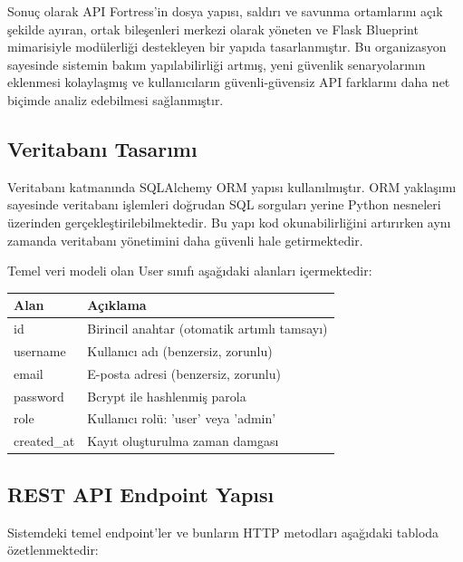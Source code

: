 Sonuç olarak API Fortress’in dosya yapısı, saldırı ve savunma ortamlarını açık şekilde ayıran, ortak bileşenleri merkezi olarak yöneten ve Flask Blueprint mimarisiyle modülerliği destekleyen bir yapıda tasarlanmıştır. Bu organizasyon sayesinde sistemin bakım yapılabilirliği artmış, yeni güvenlik senaryolarının eklenmesi kolaylaşmış ve kullanıcıların güvenli-güvensiz API farklarını daha net biçimde analiz edebilmesi sağlanmıştır.

\subsection{Veritabanı Tasarımı}
\label{veritaban-tasar-m}

Veritabanı katmanında SQLAlchemy ORM yapısı kullanılmıştır. ORM yaklaşımı sayesinde veritabanı işlemleri doğrudan SQL sorguları yerine Python nesneleri üzerinden gerçekleştirilebilmektedir. Bu yapı kod okunabilirliğini artırırken aynı zamanda veritabanı yönetimini daha güvenli hale getirmektedir.

Temel veri modeli olan User sınıfı aşağıdaki alanları içermektedir:

\begin{table}[H]
\centering
\begin{tabular}{|L{3.5cm}|L{3.5cm}|}
\hline
\textbf{Alan} & \textbf{Açıklama} \\
\hline
id & Birincil anahtar (otomatik artımlı tamsayı) \\
\hline
username & Kullanıcı adı (benzersiz, zorunlu) \\
\hline
email & E-posta adresi (benzersiz, zorunlu) \\
\hline
password & Bcrypt ile hashlenmiş parola \\
\hline
role & Kullanıcı rolü: 'user' veya 'admin' \\
\hline
created\_at & Kayıt oluşturulma zaman damgası \\
\hline
\end{tabular}
\end{table}

\subsection{REST API Endpoint Yapısı}
\label{rest-api-endpoint-yap-s}

Sistemdeki temel endpoint'ler ve bunların HTTP metodları aşağıdaki tabloda özetlenmektedir:

